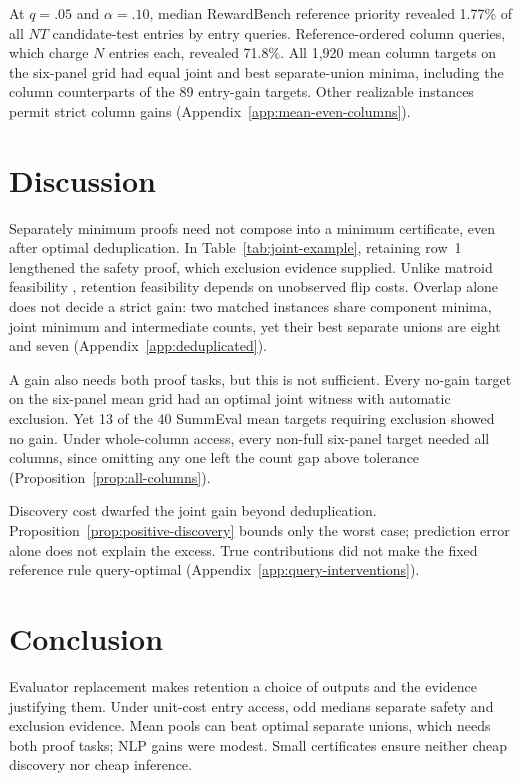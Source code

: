 \documentclass[11pt]{article}
\begin{document}
At $q=.05$ and $\alpha=.10$, median RewardBench reference priority revealed 1.77\% of all $NT$ candidate-test entries by entry queries. Reference-ordered column queries, which charge $N$ entries each, revealed 71.8\%. All 1,920 mean column targets on the six-panel grid had equal joint and best separate-union minima, including the column counterparts of the 89 entry-gain targets. Other realizable instances permit strict column gains (Appendix~\ref{app:mean-even-columns}).

\section{Discussion}
Separately minimum proofs need not compose into a minimum certificate, even after optimal deduplication. In Table~\ref{tab:joint-example}, retaining row~1 lengthened the safety proof, which exclusion evidence supplied. Unlike matroid feasibility \citep{diwan2026basis}, retention feasibility depends on unobserved flip costs. Overlap alone does not decide a strict gain: two matched instances share component minima, joint minimum and intermediate counts, yet their best separate unions are eight and seven (Appendix~\ref{app:deduplicated}).

A gain also needs both proof tasks, but this is not sufficient. Every no-gain target on the six-panel mean grid had an optimal joint witness with automatic exclusion. Yet 13 of the 40 SummEval mean targets requiring exclusion showed no gain. Under whole-column access, every non-full six-panel target needed all columns, since omitting any one left the count gap above tolerance (Proposition~\ref{prop:all-columns}).

Discovery cost dwarfed the joint gain beyond deduplication. Proposition~\ref{prop:positive-discovery} bounds only the worst case; prediction error alone does not explain the excess. True contributions did not make the fixed reference rule query-optimal (Appendix~\ref{app:query-interventions}).
\FloatBarrier
\section{Conclusion}
Evaluator replacement makes retention a choice of outputs and the evidence justifying them. Under unit-cost entry access, odd medians separate safety and exclusion evidence. Mean pools can beat optimal separate unions, which needs both proof tasks; NLP gains were modest. Small certificates ensure neither cheap discovery nor cheap inference.
\end{document}
